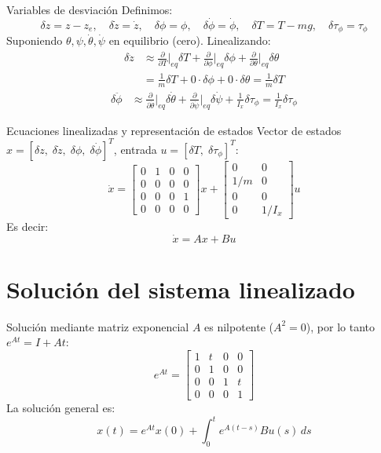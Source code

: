 \documentclass{beamer}
\begin{document}
\begin{frame}{Variables de desviación}
Definimos:
\[
\delta z = z - z_e,\quad \delta \dot{z}= \dot{z},\quad \delta \phi = \phi,\quad \delta \dot{\phi} = \dot{\phi},\quad \delta T = T-mg,\quad \delta \tau_\phi = \tau_\phi
\]
Suponiendo $\theta,\psi,\dot{\theta},\dot{\psi}$ en equilibrio (cero).
Linealizando:
\begin{align*}
\delta \ddot{z} &\approx \frac{\partial}{\partial T}\Big|_{eq} \delta T + \frac{\partial}{\partial \phi}\Big|_{eq} \delta \phi + \frac{\partial}{\partial \theta}\Big|_{eq} \delta \theta \\
&= \frac{1}{m}\delta T + 0\cdot\delta\phi + 0\cdot\delta\theta = \frac{1}{m}\delta T
\end{align*}
\begin{align*}
\delta \ddot{\phi} &\approx \frac{\partial}{\partial \dot{\theta}}\Big|_{eq} \delta\dot{\theta} + \frac{\partial}{\partial \dot{\psi}}\Big|_{eq} \delta\dot{\psi} + \frac{1}{I_x}\delta\tau_\phi = \frac{1}{I_x}\delta\tau_\phi
\end{align*}
\end{frame}

\begin{frame}{Ecuaciones linealizadas y representación de estados}
Vector de estados $x = [\delta z,\; \delta\dot{z},\; \delta\phi,\; \delta\dot{\phi}]^T$, entrada $u = [\delta T,\; \delta\tau_\phi]^T$:
\[
\dot{x} = \begin{bmatrix}
0 & 1 & 0 & 0\\
0 & 0 & 0 & 0\\
0 & 0 & 0 & 1\\
0 & 0 & 0 & 0
\end{bmatrix} x +
\begin{bmatrix}
0 & 0\\
1/m & 0\\
0 & 0\\
0 & 1/I_x
\end{bmatrix} u
\]
Es decir:
\[
\dot{x} = A x + B u
\]
\end{frame}

\section{Solución del sistema linealizado}

\begin{frame}{Solución mediante matriz exponencial}
$A$ es nilpotente ($A^2=0$), por lo tanto $e^{At} = I + At$:
\[
e^{At} = \begin{bmatrix}
1 & t & 0 & 0\\
0 & 1 & 0 & 0\\
0 & 0 & 1 & t\\
0 & 0 & 0 & 1
\end{bmatrix}
\]
La solución general es:
\[
x(t) = e^{At}x(0) + \int_0^t e^{A(t-s)} B u(s)\, ds
\]
\end{frame}
\end{document}
